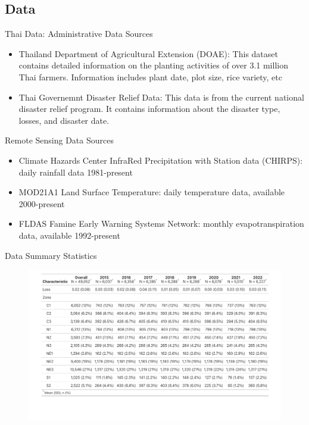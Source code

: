\documentclass{beamer}
\begin{document}
\subsection{Data}
\begin{frame}{Thai Data: Administrative Data Sources}
    \begin{itemize}
        \setlength\itemsep{2em}
        \item Thailand Department of Agricultural Extension (DOAE): This dataset contains detailed information on the planting activities of over 3.1 million Thai farmers. Information includes plant date, plot size, rice variety, etc
        \item Thai Governemnt Disaster Relief Data: This data is from the current national disaster relief program. It contains information about the disaster type, losses, and disaster date.  
    \end{itemize}
\end{frame}

\begin{frame}{Remote Sensing Data Sources}
    \begin{itemize}
        \setlength\itemsep{2em}
        \item Climate Hazards Center InfraRed Precipitation with Station data (CHIRPS): daily rainfall data 1981-present
        \item MOD21A1 Land Surface Temperature: daily temperature data, available 2000-present 
        \item FLDAS Famine Early Warning Systems Network: monthly evapotranspiration data, available 1992-present
    \end{itemize}
\end{frame}

\begin{frame}{Data Summary Statistics}
    \begin{figure}[h]
        \centering
        \includegraphics[width=\textwidth]{thai_summary_stats.png}
    \end{figure}
\end{frame}
\end{document}
